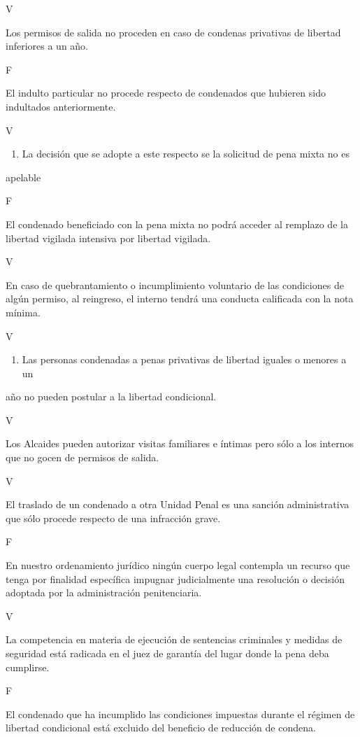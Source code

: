 \documentclass[letterpaper, 11pt]{article}
\begin{document}
V

Los permisos de salida no proceden en caso de condenas privativas de libertad
inferiores a un año.

F

El indulto particular no procede respecto de condenados que hubieren sido
indultados anteriormente.

V

\begin{enumerate}
\item La decisión que se adopte a este respecto se la solicitud de pena mixta no es
\end{enumerate}
apelable

F

El condenado beneficiado con la pena mixta no podrá acceder al remplazo de la
libertad vigilada intensiva por libertad vigilada.

V

En caso de quebrantamiento o incumplimiento voluntario de las condiciones de
algún permiso, al reingreso, el interno tendrá una conducta calificada con la nota
mínima.

V

\begin{enumerate}
\item Las personas condenadas a penas privativas de libertad iguales o menores a un
\end{enumerate}
año no pueden postular a la libertad condicional.

V

Los Alcaides pueden autorizar visitas familiares e íntimas pero sólo a los internos
que no gocen de permisos de salida.

V

El traslado de un condenado a otra Unidad Penal es una sanción administrativa
que sólo procede respecto de una infracción grave.

F

En nuestro ordenamiento jurídico ningún cuerpo legal contempla un recurso que
tenga por finalidad específica impugnar judicialmente una resolución o decisión
adoptada por la administración penitenciaria.

V

La competencia en materia de ejecución de sentencias criminales y medidas de
seguridad está radicada en el juez de garantía del lugar donde la pena deba
cumplirse.

F

El condenado que ha incumplido las condiciones impuestas durante el régimen de
libertad condicional está excluido del beneficio de reducción de condena.
\end{document}

